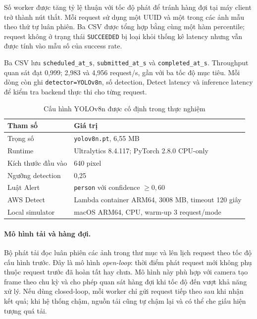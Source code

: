 Số worker được tăng tỷ lệ thuận với tốc độ phát để tránh hàng đợi tại máy client
trở thành nút thắt. Mỗi request sử dụng một UUID và một trong các ảnh mẫu theo thứ
tự luân phiên. Ba CSV được tổng hợp bằng cùng một hàm percentile; request không ở
trạng thái \texttt{SUCCEEDED} bị loại khỏi thống kê latency nhưng vẫn được tính
vào mẫu số của success rate.

Ba CSV lưu \texttt{scheduled\_at\_s}, \texttt{submitted\_at\_s} và
\texttt{completed\_at\_s}. Throughput quan sát đạt 0,999; 2,983 và 4,956
request/s, gần với ba tốc độ mục tiêu. Mỗi dòng còn ghi
\texttt{detector=YOLOv8n}, số detection, Detect latency và inference latency để
kiểm tra backend thực thi cho từng request.

\begin{table}[htbp]
    \centering
    \caption{Cấu hình YOLOv8n được cố định trong thực nghiệm}
    \label{tab:yolo-config}
    \begin{tabular}{|l|l|}
        \hline
        \textbf{Tham số} & \textbf{Giá trị} \\ \hline
        Trọng số & \texttt{yolov8n.pt}, 6,55 MB \\ \hline
        Runtime & Ultralytics 8.4.117; PyTorch 2.8.0 CPU-only \\ \hline
        Kích thước đầu vào & 640 pixel \\ \hline
        Ngưỡng detection & 0,25 \\ \hline
        Luật Alert & \texttt{person} với confidence $\geq 0,60$ \\ \hline
        AWS Detect & Lambda container ARM64, 3008 MB, timeout 120 giây \\ \hline
        Local simulator & macOS ARM64, CPU, warm-up 3 request/mode \\ \hline
    \end{tabular}
\end{table}

\paragraph{Mô hình tải và hàng đợi.}

Bộ phát tải đọc luân phiên các ảnh trong thư mục và lên lịch request theo tốc độ
cấu hình trước. Đây là mô hình \emph{open-loop}: thời điểm phát request mới không
phụ thuộc request trước đã hoàn tất hay chưa. Mô hình này phù hợp với camera tạo
frame theo chu kỳ và cho phép quan sát hàng đợi khi tốc độ đến vượt khả năng xử lý.
Nếu dùng closed-loop, mỗi worker chỉ gửi request tiếp theo sau khi nhận kết quả;
khi hệ thống chậm, nguồn tải cũng tự chậm lại và có thể che giấu hiện tượng quá tải.

